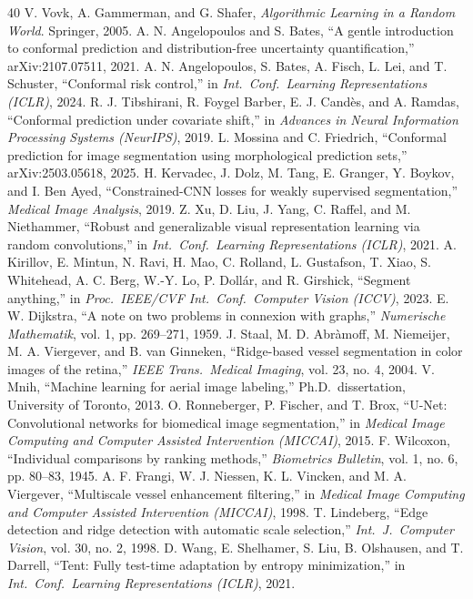\documentclass[10pt,letterpaper,journal]{IEEEtran}
\newcommand{\1}{\mathbf{1}}
\begin{document}
\begin{thebibliography}{40}
 V. Vovk, A. Gammerman, and G. Shafer, \emph{Algorithmic Learning in a Random World}. Springer, 2005.
 A. N. Angelopoulos and S. Bates, ``A gentle introduction to conformal prediction and distribution-free uncertainty quantification,'' arXiv:2107.07511, 2021.
 A. N. Angelopoulos, S. Bates, A. Fisch, L. Lei, and T. Schuster, ``Conformal risk control,'' in \emph{Int.\ Conf.\ Learning Representations (ICLR)}, 2024.
 R. J. Tibshirani, R. Foygel Barber, E. J. Cand\`es, and A. Ramdas, ``Conformal prediction under covariate shift,'' in \emph{Advances in Neural Information Processing Systems (NeurIPS)}, 2019.
 L. Mossina and C. Friedrich, ``Conformal prediction for image segmentation using morphological prediction sets,'' arXiv:2503.05618, 2025.
 H. Kervadec, J. Dolz, M. Tang, E. Granger, Y. Boykov, and I. Ben Ayed, ``Constrained-CNN losses for weakly supervised segmentation,'' \emph{Medical Image Analysis}, 2019.
 Z. Xu, D. Liu, J. Yang, C. Raffel, and M. Niethammer, ``Robust and generalizable visual representation learning via random convolutions,'' in \emph{Int.\ Conf.\ Learning Representations (ICLR)}, 2021.
 A. Kirillov, E. Mintun, N. Ravi, H. Mao, C. Rolland, L. Gustafson, T. Xiao, S. Whitehead, A. C. Berg, W.-Y. Lo, P. Doll\'ar, and R. Girshick, ``Segment anything,'' in \emph{Proc.\ IEEE/CVF Int.\ Conf.\ Computer Vision (ICCV)}, 2023.
 E. W. Dijkstra, ``A note on two problems in connexion with graphs,'' \emph{Numerische Mathematik}, vol. 1, pp. 269--271, 1959.
 J. Staal, M. D. Abr\`amoff, M. Niemeijer, M. A. Viergever, and B. van Ginneken, ``Ridge-based vessel segmentation in color images of the retina,'' \emph{IEEE Trans.\ Medical Imaging}, vol. 23, no. 4, 2004.
 V. Mnih, ``Machine learning for aerial image labeling,'' Ph.D.\ dissertation, University of Toronto, 2013.
 O. Ronneberger, P. Fischer, and T. Brox, ``U-Net: Convolutional networks for biomedical image segmentation,'' in \emph{Medical Image Computing and Computer Assisted Intervention (MICCAI)}, 2015.
 F. Wilcoxon, ``Individual comparisons by ranking methods,'' \emph{Biometrics Bulletin}, vol. 1, no. 6, pp. 80--83, 1945.
 A. F. Frangi, W. J. Niessen, K. L. Vincken, and M. A. Viergever, ``Multiscale vessel enhancement filtering,'' in \emph{Medical Image Computing and Computer Assisted Intervention (MICCAI)}, 1998.
 T. Lindeberg, ``Edge detection and ridge detection with automatic scale selection,'' \emph{Int.\ J.\ Computer Vision}, vol. 30, no. 2, 1998.
 D. Wang, E. Shelhamer, S. Liu, B. Olshausen, and T. Darrell, ``Tent: Fully test-time adaptation by entropy minimization,'' in \emph{Int.\ Conf.\ Learning Representations (ICLR)}, 2021.
\end{thebibliography}
\end{document}
